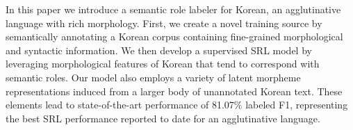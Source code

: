 In this paper we introduce a semantic role labeler for Korean, an agglutinative language with rich morphology. First, we create a novel training source by semantically annotating a Korean corpus containing fine-grained morphological and syntactic information. We then develop a supervised SRL model by leveraging morphological features of Korean that tend to correspond with semantic roles. Our model also employs a variety of latent morpheme representations induced from a larger body of unannotated Korean text. These elements lead to state-of-the-art performance of 81.07\% labeled F1, representing the best SRL performance reported to date for an agglutinative language.
